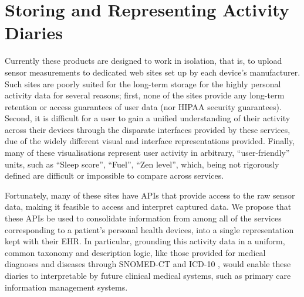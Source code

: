 \documentclass{chi-ext}
\begin{document}


\section{Storing and Representing Activity Diaries}

Currently these products are designed to work in isolation, that is, to upload sensor measurements to dedicated web sites set up by each device's manufacturer.  Such sites are poorly suited for the long-term storage for the highly personal activity data for several reasons; first, none of the sites provide any long-term retention or access guarantees of user data (nor HIPAA security guarantees).  Second, it is difficult for a user to gain a unified understanding of their activity across their devices through the disparate interfaces provided by these services, due of the widely different visual and interface representations provided. Finally, many of these visualisations represent user activity in arbitrary, ``user-friendly'' units, such as ``Sleep score'', ``Fuel'', ``Zen level'', which, being not rigorously defined are difficult or impossible to compare across services.

Fortunately, many of these sites have APIs that provide access to the raw sensor data, making it feasible to access and interpret captured data.  We propose that these APIs be used to consolidate information from among all of the services corresponding to a patient's personal health devices, into a single representation kept with their EHR.  In particular, grounding this activity data in a uniform, common taxonomy and description logic, like those provided for medical diagnoses and diseases through SNOMED-CT \cite{stearns2001snomed} and ICD-10 \cite{world1993icd}, would enable these diaries to interpretable by future clinical medical systems, such as primary care information management systems. 
\end{document}
